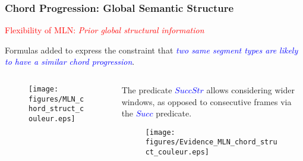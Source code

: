 \documentclass[12pt]{beamer}
\begin{document}
\begin{frame}
\frametitle{Chord Progression: Global Semantic Structure}

\textcolor{red}{Flexibility of MLN: \textit{Prior global structural information}}
\medskip 


Formulas added to express the constraint that \textcolor{blue}{\textit{two same segment types are likely to have a similar chord progression}}.
\medskip 

\begin{columns}[c] 

\begin{column}{0.6\textwidth} 


\vspace{-1.0cm}
\begin{figure}[htb]
   \centering
   \texttt{[image: figures/MLN\_chord\_struct\_couleur.eps]}
\end{figure}
\end{column} 

\begin{column}{0.4\textwidth} 

\vspace{-0.2cm}
The predicate \textcolor{blue}{$SuccStr$} allows considering wider windows, as opposed to consecutive frames via the \textcolor{blue}{$Succ$} predicate.

\vspace{-0.3cm}
\begin{figure}[htb]
   \centering
   \texttt{[image: figures/Evidence\_MLN\_chord\_struct\_couleur.eps]}
\end{figure}

\end{column} 

\end{columns} 

\end{frame}
\end{document}

